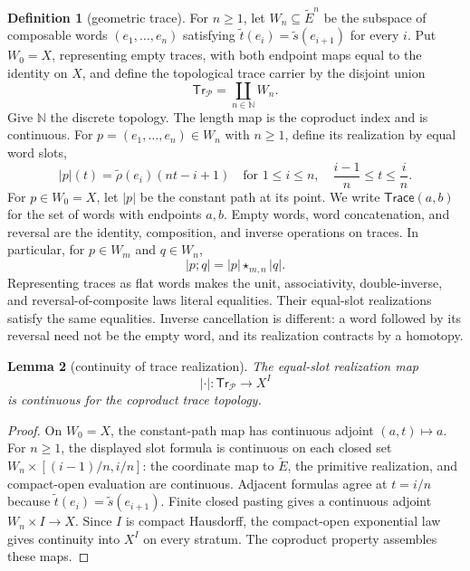 \documentclass[10pt,reqno]{amsart}
\theoremstyle{definition}
\newtheorem{definition}{Definition}[section]
\theoremstyle{plain}
\newtheorem{lemma}[definition]{Lemma}
\theoremstyle{remark}
\newcommand{\Trace}{\mathsf{Trace}}
\newcommand{\N}{\mathbb N}
\begin{document}
\begin{definition}[geometric trace]
For $n\geq 1$, let $W_n\subseteq\widetilde E^n$ be the subspace of composable
words $(e_1,\ldots,e_n)$ satisfying
\(\widetilde t(e_i)=\widetilde s(e_{i+1})\) for every $i$.  Put $W_0=X$, representing empty traces,
with both endpoint maps equal to the identity on $X$, and define the
topological trace carrier by the disjoint union
\[
  \mathsf{Tr}_{\mathcal P}=\coprod_{n\in\N}W_n.
\]
Give $\N$ the discrete topology.  The length map is the coproduct index and
is continuous.  For $p=(e_1,\ldots,e_n)\in W_n$ with
$n\geq1$, define its realization by equal word slots,
\[
 |p|(t)=\widetilde\rho(e_i)(nt-i+1)
 \quad\text{for }1\leq i\leq n,\quad
 \frac{i-1}{n}\leq t\leq\frac{i}{n}.
\]
For $p\in W_0=X$, let $|p|$ be the constant path at its point.  We write
\(\Trace(a,b)\) for the set of words with endpoints $a,b$.  Empty words, word
concatenation, and reversal are the identity, composition, and inverse
operations on traces.  In particular, for $p\in W_m$ and
$q\in W_n$,
\[
 |p;q|=|p|\star_{m,n}|q|.
\]
Representing traces as flat words makes the unit, associativity,
double-inverse, and reversal-of-composite laws literal equalities.
Their equal-slot realizations satisfy the same equalities.
Inverse cancellation is different: a word followed by its reversal need
not be the empty word, and its realization contracts by a homotopy.

\end{definition}

\begin{lemma}[continuity of trace realization]
\label{lem:trace-realization-continuous}
The equal-slot realization map
\[
  |\cdot|:\mathsf{Tr}_{\mathcal P}\longrightarrow X^I
\]
is continuous for the coproduct trace topology.
\end{lemma}

\begin{proof}
On $W_0=X$, the constant-path map has continuous adjoint $(a,t)\mapsto a$.
For $n\geq1$, the displayed slot formula is continuous on each closed set
$W_n\times[(i-1)/n,i/n]$: the coordinate map to $\widetilde E$, the
primitive realization, and compact-open evaluation are continuous.
Adjacent formulas agree at $t=i/n$ because
$\widetilde t(e_i)=\widetilde s(e_{i+1})$.
Finite closed pasting gives a continuous adjoint $W_n\times I\to X$.
Since $I$ is compact Hausdorff, the compact-open exponential law gives
continuity into $X^I$ on every stratum. The coproduct property assembles
these maps.
\end{proof}
\end{document}
